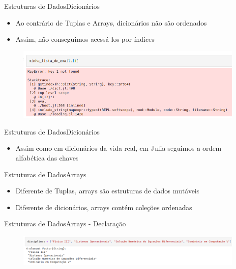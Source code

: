 \documentclass{beamer}
\begin{document}
\begin{frame}{Estruturas de Dados}{Dicionários}
    \begin{itemize}
        \item Ao contrário de Tuplas e Arrays, dicionários não são ordenados
        \item Assim, não conseguimos acessá-los por índices
    \end{itemize}
    \begin{figure}
        \centering
        \includegraphics[scale=0.4]{imagens/dicionario06.png}
        \label{fig:my_label}
    \end{figure}
\end{frame}

\begin{frame}{Estruturas de Dados}{Dicionários}
    \begin{itemize}
        \item Assim como em dicionários da vida real, em Julia seguimos a ordem alfabética das chaves
    \end{itemize}
\end{frame}

\begin{frame}{Estruturas de Dados}{Arrays}
    \begin{itemize}
        \item Diferente de Tuplas, arrays são estruturas de dados mutáveis
        \item Diferente de dicionários, arrays contém coleções ordenadas
    \end{itemize}
\end{frame}

\begin{frame}{Estruturas de Dados}{Arrays - Declaração}
    \begin{figure}
        \centering
        \includegraphics[scale=0.34]{imagens/array01.png}
        \label{fig:my_label}
    \end{figure}
\end{frame}
\end{document}
